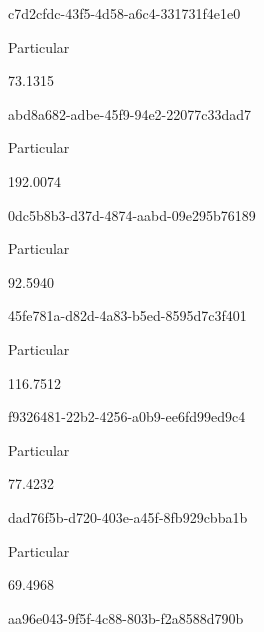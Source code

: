 \documentclass[
  11pt,
  a4paper,
  DIV=11,
  numbers=noendperiod]{scrartcl}
\begin{document}
c7d2cfdc-43f5-4d58-a6c4-331731f4e1e0

\n      

Particular

\n      

73.1315

\n    

\n    

\n      

abd8a682-adbe-45f9-94e2-22077c33dad7

\n      

Particular

\n      

192.0074

\n    

\n    

\n      

0dc5b8b3-d37d-4874-aabd-09e295b76189

\n      

Particular

\n      

92.5940

\n    

\n    

\n      

45fe781a-d82d-4a83-b5ed-8595d7c3f401

\n      

Particular

\n      

116.7512

\n    

\n    

\n      

f9326481-22b2-4256-a0b9-ee6fd99ed9c4

\n      

Particular

\n      

77.4232

\n    

\n    

\n      

dad76f5b-d720-403e-a45f-8fb929cbba1b

\n      

Particular

\n      

69.4968

\n    

\n    

\n      

aa96e043-9f5f-4c88-803b-f2a8588d790b
\end{document}
